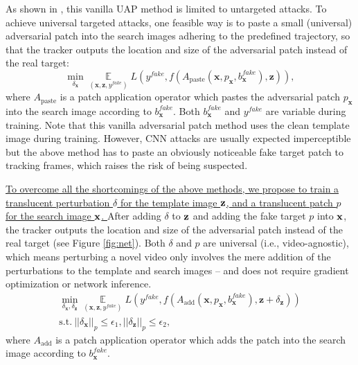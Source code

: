 \documentclass[journal]{IEEEtran}
\newcommand{\ie}{i.e.}
\begin{document}
As shown in \cite{hirano2020simple}, this vanilla UAP method is limited to untargeted attacks.
To achieve universal targeted attacks, one feasible way is to paste a small (universal) adversarial patch into the search images adhering to the predefined trajectory, so that the tracker outputs the location and size of the adversarial patch instead of the real target:
\begin{equation}
    \min\limits_{\delta_\textbf{x}} \mathop{\mathbb{E}}\limits_{(\textbf{x}, \textbf{z}, y^{fake})} L(y^{fake}, f(A_{\text{paste}}(\textbf{x}, p_\textbf{x}, b^{fake}_{\textbf{x}}), \textbf{z})),
\end{equation}
where $A_{\text{paste}}$ is a patch application operator \cite{patch} which pastes the adversarial patch $p_\textbf{x}$ into the search image according to $b^{fake}_{\textbf{x}}$. Both $b^{fake}_{\textbf{x}}$ and $y^{fake}$ are variable during training.
Note that this vanilla adversarial patch method uses the clean template image during training. However, CNN attacks are usually expected imperceptible but the above method has to paste an obviously noticeable fake target patch to tracking frames, which raises the risk of being suspected.

\uline{
To overcome all the shortcomings of the above methods, we propose to train a translucent perturbation $\delta$ for the template image $\textbf z$, and a translucent patch $p$ for the search image $\textbf x$. 
}
After adding $\delta$ to $\textbf z$ and adding the fake target $p$ into $\textbf x$, the tracker outputs the location and size of the adversarial patch instead of the real target (see Figure \ref{fig:net}). Both $\delta$ and $p$ are universal (\ie, video-agnostic), which means perturbing a novel video only involves the mere addition of the perturbations to the template and search images -- and does not require gradient optimization or network inference.
\begin{equation}
  \begin{gathered}
    \min\limits_{\delta_\textbf{x}, \delta_\textbf{z}} \mathop{\mathbb{E}}\limits_{(\textbf{x}, \textbf{z}, y^{fake})} L(y^{fake}, f(A_{\text{add}}(\textbf{x}, p_\textbf{x}, b^{fake}_{\textbf{x}}), \textbf{z} + \delta_\textbf{z}))\\
    \text{s.t.}\ ||\delta_\textbf{x}||_p \le \epsilon_1, ||\delta_\textbf{z}||_p \le \epsilon_2,
  \end{gathered}
\end{equation}
where $A_{\text{add}}$ is a patch application operator \cite{patch} which adds the patch into the search image according to $b^{fake}_{\textbf{x}}$.
\end{document}
